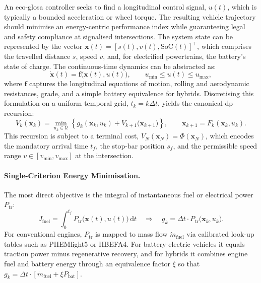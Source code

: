 An \ac{eco-glosa} controller seeks to find a longitudinal control signal, $u(t)$, which is typically a bounded acceleration or wheel torque. The resulting vehicle trajectory should minimise an energy-centric performance index while guaranteeing legal and safety compliance at signalised intersections. The system state can be represented by the vector $\mathbf x(t) = [s(t), v(t), \mathrm{SoC}(t)]^{\!\top}$, which comprises the travelled distance $s$, speed $v$, and, for electrified powertrains, the battery's state of charge. The continuous-time dynamics can be abstracted as:
\begin{equation*}
    \dot{\mathbf x}(t) = \mathbf f\bigl(\mathbf x(t), u(t)\bigr),
    \qquad
    u_{\min} \le u(t) \le u_{\max},
\end{equation*}
where $\mathbf f$ captures the longitudinal equations of motion, rolling and aerodynamic resistances, grade, and a simple battery equivalence for hybrids. Discretising this formulation on a uniform temporal grid, $t_k = k \Delta t$, yields the canonical \ac{dp} recursion:
\begin{equation*}
    V_k(\mathbf x_k) = \min_{u_k \in \mathcal U} \left\{ g_k(\mathbf x_k, u_k) + V_{k+1}\bigl(\mathbf x_{k+1} \bigr) \right\},
    \qquad
    \mathbf x_{k+1} = F_k(\mathbf x_k, u_k).
\end{equation*}
This recursion is subject to a terminal cost, $V_{N}(\mathbf x_N)=\Phi(\mathbf x_N)$, which encodes the mandatory arrival time $t_f$, the stop-bar position $s_f$, and the permissible speed range $v\in[v_{\min},v_{\max}]$ at the intersection.

\paragraph{Single-Criterion Energy Minimisation.}
The most direct objective is the integral of instantaneous fuel or electrical power $P_{\text{tr}}$:
\begin{equation*}
\label{eq:single}
    J_{\text{fuel}} = \int_{0}^{t_f} P_{\text{tr}}\bigl(\mathbf x(t), u(t)\bigr)\,\mathrm{d}t
    \quad\Longrightarrow\quad
    g_k = \Delta t \cdot P_{\text{tr}}\bigl(\mathbf x_k, u_k\bigr).
\end{equation*}
For conventional engines, $P_{\text{tr}}$ is mapped to mass flow $\dot m_{\text{fuel}}$ via calibrated look-up tables such as PHEMlight5 or HBEFA4. For battery-electric vehicles it equals traction power minus regenerative recovery, and for hybrids it combines engine fuel and battery energy through an equivalence factor $\xi$ so that $g_k = \Delta t \cdot \left[ \dot m_{\text{fuel}} + \xi P_{\text{bat}} \right]$.

